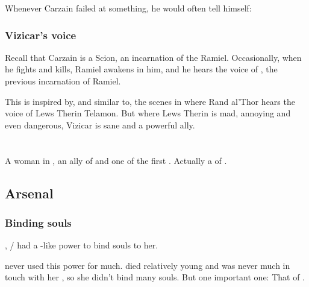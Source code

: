 Whenever Carzain failed at something, he would often tell himself: 





\subsubsection{Vizicar's voice}
Recall that Carzain is a Scion, an incarnation of the \Malach{} Ramiel. 
Occasionally, when he fights and kills, Ramiel awakens in him, and he hears the voice of \VizicarDurasRespina, the previous incarnation of Ramiel. 

This is inspired by, and similar to, the scenes in  where Rand al'Thor hears the voice of Lews Therin Telamon. But where Lews Therin is mad, annoying and even dangerous, Vizicar is sane and a powerful ally. 















\section{\Delphine}
\index{\Delphine}
A \human{} woman in , an ally of  and one of the first . 
Actually a  of . 









\subsection{Arsenal}





\subsubsection{Binding souls}
\index{\carcer!\Delphine}
, \Shiaraid{}/\Delphine{} had a \sephirah-like power to bind souls to her. 

\Delphine{} never used this power for much. 
\Delphine{} died relatively young and was never much in touch with her \carcer, so she didn't bind many souls. 
But  one important one: 
That of \Eryal. 










